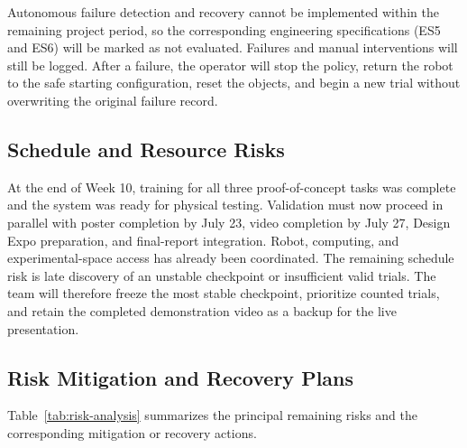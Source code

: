 \documentclass[12pt, letterpaper]{article}
\begin{document}
Autonomous failure detection and recovery cannot be implemented within the
remaining project period, so the corresponding engineering specifications
(ES5 and ES6) will be marked as not evaluated. Failures and manual interventions
will still be logged. After a failure, the operator will stop the policy,
return the robot to the safe starting configuration, reset the objects, and
begin a new trial without overwriting the original failure record.

\subsection{Schedule and Resource Risks}

At the end of Week 10, training for all three proof-of-concept tasks was
complete and the system was ready for physical testing. Validation must now
proceed in parallel with poster completion by July 23, video completion by July
27, Design Expo preparation, and final-report integration. Robot, computing,
and experimental-space access has already been coordinated. The remaining
schedule risk is late discovery of an unstable checkpoint or insufficient valid
trials. The team will therefore freeze the most stable checkpoint, prioritize
counted trials, and retain the completed demonstration video as a backup for
the live presentation.

\subsection{Risk Mitigation and Recovery Plans}

Table~\ref{tab:risk-analysis} summarizes the principal remaining risks and the
corresponding mitigation or recovery actions.
\end{document}
